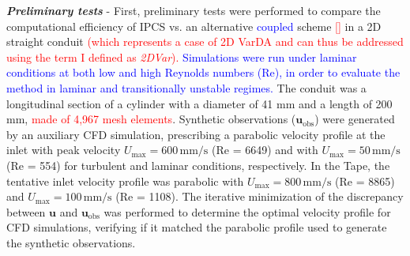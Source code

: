 \label{sec:bench}
\textbf{\textit{Preliminary tests}} - 
First, preliminary tests were performed to compare the computational efficiency of IPCS vs. an alternative \textcolor{blue}{coupled} scheme \textcolor{red}{[\cite{Figueroa2006}]} in a 2D straight conduit \textcolor{red}{(which represents a case of 2D VarDA and can thus be addressed using the term I defined as \emph{2DVar}).} \textcolor{blue}{Simulations were run under laminar conditions at both low and high Reynolds numbers (Re), in order to evaluate the method in laminar and transitionally unstable regimes. } 
The conduit was a longitudinal section of a cylinder with a diameter of 41 mm and a length of 200 mm, \textcolor{red}{made of 4,967 mesh elements}. Synthetic observations (\( \mathbf{u}_{\text{obs}} \)) were generated by an auxiliary CFD simulation, prescribing a parabolic velocity profile at the inlet with peak velocity \( U_{\text{max}} = 600 \, \text{mm/s} \) (Re = 6649) and with \( U_{\text{max}} = 50 \, \text{mm/s} \) (Re = 554) for turbulent and laminar conditions, respectively.
In the Tape, the tentative inlet velocity profile was parabolic with \( U_{\text{max}} = 800 \, \text{mm/s} \) (Re = 8865) and \( U_{\text{max}} = 100 \, \text{mm/s} \) (Re = 1108).
The iterative minimization of the discrepancy between \( \mathbf{u} \) and \( \mathbf{u}_{\text{obs}} \) was performed to determine the optimal velocity profile for CFD simulations, verifying if it matched the parabolic profile used to generate the synthetic observations.\\

